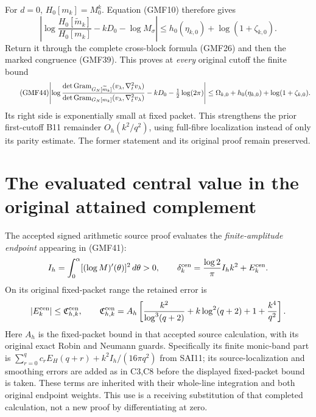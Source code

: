 For \(d=0\), \(H_0[m_k]=M_0^k\).
Equation (GMF10) therefore gives
\[
 \left|\log\frac{H_0[\widetilde m_k]}{H_0[m_k]}
            -kD_0-\log M_\sigma\right|
 \le h_0(\eta_{k,0})+\log(1+\zeta_{k,0}).
\]
Return it through the complete cross-block formula
(GMF26) and then the marked congruence (GMF39).
This proves at \emph{every} original cutoff the finite bound
\begin{equation}\tag{GMF44}
\begin{split}
 \left|
 \log\frac{\det\operatorname{Gram}_{G_N[\widetilde m_k]}(v_\lambda,\nabla_t^2v_\lambda)}
              {\det\operatorname{Gram}_{G_N[m_k]}(v_\lambda,\nabla_t^2v_\lambda)}
       -kD_0-\tfrac12\log(2\pi)
 \right|
 \le\Omega_{k,0}+h_0(\eta_{k,0})+\log(1+\zeta_{k,0}).
\end{split}
\end{equation}
Its right side is exponentially small at fixed packet.
This strengthens the prior first-cutoff B11 remainder
\(O_h(k^2/q^2)\), using full-fibre localization instead
of only its parity estimate.  The former statement and
its original proof remain preserved.

\section{The evaluated central value in the original attained complement}

The accepted signed arithmetic source proof
\cite[C32 and SAI1--SAI11]{a02gmf:signedCentral} evaluates the
\emph{finite-amplitude endpoint} appearing in (GMF41):
\[
 I_h=\int_0^\alpha[(\log M)'(\theta)]^2\,d\theta>0,\qquad
 \delta_k^{\rm cen}
  =\frac{\log2}{\pi}I_h k^2+E_k^{\rm cen}.
\]
On its original fixed-packet range the retained error is
\[
 |E_k^{\rm cen}|
 \le \mathfrak C_{h,k}^{\rm cen},\qquad
 \mathfrak C_{h,k}^{\rm cen}
 =A_h\left[
 \frac{k^2}{\log^3(q+2)}+k\log^2(q+2)+1+\frac{k^4}{q^2}
 \right].
\]
Here \(A_h\) is the fixed-packet bound in that accepted
source calculation, with its original exact Robin and
Neumann guards.  Specifically its finite monic-band part
is \(\sum_{r=0}^q c_rE_H(q+r)+k^2I_h/(16\pi q^2)\)
from SAI11; its source-localization and smoothing errors
are added as in C3,C8 before the displayed fixed-packet
bound is taken.  These terms are inherited with their
whole-line integration and both original endpoint weights.
This use is a receiving substitution of that completed
calculation, not a new proof by differentiating at zero.

